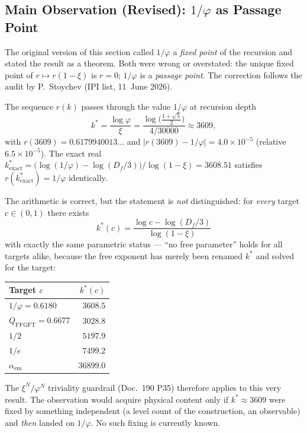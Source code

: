 \subsection{Main Observation (Revised): $1/\varphi$ as Passage Point}\label{sec:passage275en}

\begin{remark}
The original version of this section called $1/\varphi$ a \emph{fixed
point} of the recursion and stated the result as a theorem. Both were
wrong or overstated: the unique fixed point of $r\mapsto r(1-\xi)$ is
$r=0$; $1/\varphi$ is a \emph{passage point}. The correction follows
the audit by P.~Stoychev (IPI list, 11~June 2026).
\end{remark}

\begin{observationstar}
The sequence $r(k)$ passes through the value $1/\varphi$ at recursion
depth
\begin{equation}
  k^* = \frac{\log\varphi}{\xi}
      = \frac{\log\!\bigl(\tfrac{1+\sqrt{5}}{2}\bigr)}{4/30000}
      \approx 3609,
  \label{eq:kstar275en}
\end{equation}
with $r(3609) = 0.6179940013\ldots$ and
$|r(3609)-1/\varphi| = 4.0\times10^{-5}$
(relative $6.5\times10^{-5}$). The exact real
$k^*_\mathrm{exact} = \bigl(\log(1/\varphi)-\log(D_f/3)\bigr)/\log(1-\xi)
= 3608.51$ satisfies $r(k^*_\mathrm{exact}) = 1/\varphi$ identically.
\end{observationstar}

\begin{remark}
The arithmetic is correct, but the statement is \emph{not}
distinguished: for \emph{every} target $c\in(0,1)$ there exists
\begin{equation}
  k^*(c) = \frac{\log c - \log(D_f/3)}{\log(1-\xi)}
\end{equation}
with exactly the same parametric status --- \enquote{no free
parameter} holds for all targets alike, because the free exponent has
merely been renamed $k^*$ and solved for the target:
\begin{center}
\begin{tabular}{@{}lr@{}}
\toprule
Target $c$ & $k^*(c)$ \\
\midrule
$1/\varphi = 0.6180$        & $3608.5$ \\
$Q_\mathrm{FFGFT} = 0.6677$ & $3028.8$ \\
$1/2$                        & $5197.9$ \\
$1/e$                        & $7499.2$ \\
$\alpha_\mathrm{em}$        & $36899.0$ \\
\bottomrule
\end{tabular}
\end{center}
The $\xi^N/\varphi^N$ triviality guardrail (Doc.~190 P35) therefore
applies to this very result. The observation would acquire physical
content only if $k^*\approx 3609$ were fixed by something independent
(a level count of the construction, an observable) and \emph{then}
landed on $1/\varphi$. No such fixing is currently known.
\end{remark}

